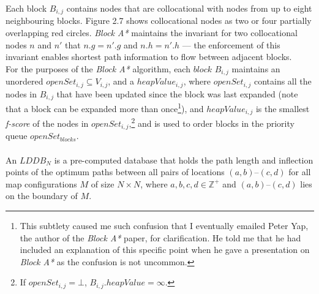 \documentclass[12pt,notitlepage]{report}
\begin{document}
\noindent
Each block $B_{i,j}$ contains nodes that are collocational with nodes from up to eight neighbouring blocks. Figure 2.7 shows collocational nodes as two or four partially overlapping red circles. {\em Block A*} maintains the invariant for two collocational nodes $n$ and $n'$ that $n.g = n'.g$ and $n.h = n'.h$ --- the enforcement of this invariant enables shortest path information to flow between adjacent blocks.\\

\noindent
For the purposes of the {\em Block A*} algorithm, each $block$ $B_{i,j}$ maintains an unordered $openSet_{i,j} \subseteq V_{i,j}$, and a $heapValue_{i,j}$, where $openSet_{i,j}$ contains all the nodes in $B_{i,j}$ that have been updated since the block was last expanded (note that a block can be expanded more than once\footnote{This subtlety caused me such confusion that I eventually emailed Peter Yap, the author of the {\em Block A*} paper, for clarification. He told me that he had included an explanation of this specific point when he gave a presentation on {\em Block A*} as the confusion is not uncommon.}), and $heapValue_{i,j}$ is the smallest {\em f-score} of the nodes in $openSet_{i,j}$,\footnote{If $openSet_{i,j} = \bot$, $B_{i,j}.heapValue = \infty$.} and is used to order blocks in the priority queue $openSet_{blocks}$.\\


\\
\noindent
An $LDDB_{N}$ is a pre-computed database that holds the path length and inflection points of the optimum paths between all pairs of locations $(a,b)$--$(c,d)$ for all map configurations $M$ of size $N \times N$, where $a,b,c,d \in \mathbb{Z^+}$ and $(a,b)$--$(c,d)$ lies on the boundary of $M$.\\
\end{document}
